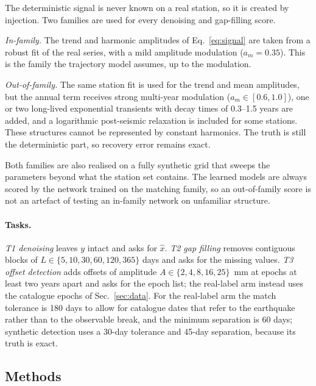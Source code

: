 The deterministic signal is never known on a real station, so it is created by
injection. Two families are used for every denoising and gap-filling score.

\emph{In-family.} The trend and harmonic amplitudes of Eq.~\eqref{eq:signal} are
taken from a robust fit of the real series, with a mild amplitude modulation
($a_m=0.35$). This is the family the trajectory model assumes, up to the
modulation.

\emph{Out-of-family.} The same station fit is used for the trend and mean
amplitudes, but the annual term receives strong multi-year modulation
($a_m\in[0.6,1.0]$), one or two long-lived exponential transients with decay
times of 0.3--1.5 years are added, and a logarithmic post-seismic relaxation is
included for some stations. These structures cannot be represented by constant
harmonics. The truth is still the deterministic part, so recovery error remains
exact.

Both families are also realised on a fully synthetic grid that sweeps the
parameters beyond what the station set contains. The learned models are always
scored by the network trained on the matching family, so an out-of-family score
is not an artefact of testing an in-family network on unfamiliar structure.

\paragraph{Tasks.}
\emph{T1 denoising} leaves $y$ intact and asks for $\hat{x}$. \emph{T2 gap
filling} removes contiguous blocks of $L\in\{5,10,30,60,120,365\}$ days and asks
for the missing values. \emph{T3 offset detection} adds offsets of amplitude
$A\in\{2,4,8,16,25\}$~mm at epochs at least two years apart and asks for the
epoch list; the real-label arm instead uses the catalogue epochs of
Sec.~\ref{sec:data}. For the real-label arm the match tolerance is 180 days to
allow for catalogue dates that refer to the earthquake rather than to the
observable break, and the minimum separation is 60 days; synthetic detection uses
a 30-day tolerance and 45-day separation, because its truth is exact.

\subsection{Methods}
\label{sec:method:methods}

